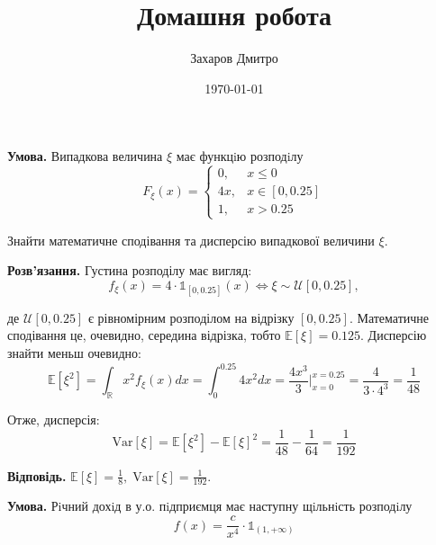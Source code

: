 \documentclass[oneside,solution]{karazin-prob-theory-assign}
\title{Домашня робота}
\author{Захаров Дмитро}
\date{\today}
\begin{document}
\maketitle



\hspace{20px}\textbf{Умова.} Випадкова величина $\xi$ має функцiю розподiлу
\begin{equation}
    F_{\xi}(x) = \begin{cases}
        0, & x \leq 0 \\
        4x, & x \in [0,0.25] \\
        1, & x > 0.25
    \end{cases}
\end{equation}

Знайти математичне сподівання та дисперсію випадкової величини $\xi$.

\textbf{Розв'язання.} Густина розподілу має вигляд:
\begin{equation}
    f_{\xi}(x) = 4 \cdot \mathds{1}_{[0,0.25]}(x) \iff \xi \sim \mathcal{U}[0,0.25],
\end{equation}

де $\mathcal{U}[0,0.25]$ є рівномірним розподілом на відрізку $[0,0.25]$. Математичне сподівання це, очевидно, середина відрізка, тобто $\mathbb{E}[\xi] = 0.125$. Дисперсію знайти меньш очевидно:
\begin{equation}
    \mathbb{E}[\xi^2] = \int_{\mathbb{R}}x^2f_{\xi}(x)dx = \int_{0}^{0.25} 4x^2 dx = \frac{4x^3}{3}\Big|_{x=0}^{x=0.25} = \frac{4}{3 \cdot 4^3} = \frac{1}{48}
\end{equation}

Отже, дисперсія:
\begin{equation}
    \text{Var}[\xi] = \mathbb{E}[\xi^2] -  \mathbb{E}[\xi]^2 = \frac{1}{48} - \frac{1}{64} =  \frac{1}{192}
\end{equation}

\textbf{Відповідь.} $\mathbb{E}[\xi]=\frac{1}{8}, \; \text{Var}[\xi] = \frac{1}{192}$.


\hspace{20px}\textbf{Умова.} Рiчний дохiд в у.о. пiдприємця має наступну щiльнiсть розподiлу
\begin{equation}
    f(x) = \frac{c}{x^4} \cdot \mathds{1}_{(1,+\infty)}
\end{equation}
\end{document}
